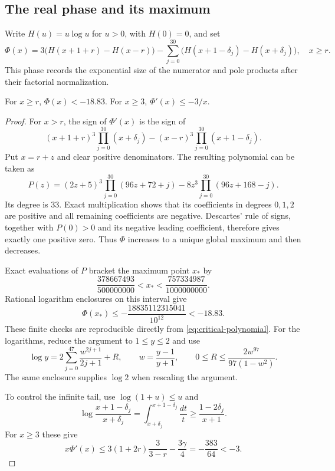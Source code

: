 \subsection{The real phase and its maximum}
Write $H(u)=u\log u$ for $u>0$, with $H(0)=0$, and set
\begin{equation}\label{eq:phase}
 \Phi(x)=3\bigl(H(x+1+r)-H(x-r)\bigr)
 -\sum_{j=0}^{30}\bigl(H(x+1-\delta_j)-H(x+\delta_j)\bigr),
 \quad x\ge r.
\end{equation}
This phase records the exponential size of the numerator and pole
products after their factorial normalization.

\begin{lemma}\label{lem:phase}
For $x\ge r$, $\Phi(x)<-18.83$. For $x\ge3$,
$\Phi'(x)\le-3/x$.
\end{lemma}
\begin{proof}
For $x>r$, the sign of $\Phi'(x)$ is the sign of
\[
 (x+1+r)^3\prod_{j=0}^{30}(x+\delta_j)
                  -(x-r)^3\prod_{j=0}^{30}(x+1-\delta_j).
\]
Put $x=r+z$ and clear positive denominators. The resulting polynomial
can be taken as
\begin{equation}\label{eq:critical-polynomial}
 P(z)=(2z+5)^3\prod_{j=0}^{30}(96z+72+j)
                       -8z^3\prod_{j=0}^{30}(96z+168-j).
\end{equation}
Its degree is $33$. Exact multiplication shows that its coefficients
in degrees $0,1,2$ are positive and all remaining coefficients are
negative. Descartes' rule of signs, together with $P(0)>0$ and its
negative leading coefficient, therefore gives exactly one positive
zero. Thus $\Phi$ increases to a unique global maximum and then
decreases.

Exact evaluations of $P$ bracket the maximum point $x_*$ by
\[
 \frac{378667493}{500000000}<x_*<\frac{757334987}{1000000000}.
\]
Rational logarithm enclosures on this interval give
\begin{equation}\label{eq:phase-certificate}
 \Phi(x_*)\le-\frac{18835112315041}{10^{12}}<-18.83.
\end{equation}
These finite checks are reproducible directly from
\eqref{eq:critical-polynomial}. For the logarithms, reduce the
argument to $1\le y\le2$ and use
\[
 \log y=2\sum_{j=0}^{47}\frac{w^{2j+1}}{2j+1}+R,
 \qquad w=\frac{y-1}{y+1},\qquad
 0\le R\le\frac{2w^{97}}{97(1-w^2)}.
\]
The same enclosure supplies $\log2$ when rescaling the argument.

To control the infinite tail, use $\log(1+u)\le u$ and
\[
 \log\frac{x+1-\delta_j}{x+\delta_j}
 =\int_{x+\delta_j}^{x+1-\delta_j}\frac{dt}{t}
 \ge\frac{1-2\delta_j}{x+1}.
\]
For $x\ge3$ these give
\[
 x\Phi'(x)\le3(1+2r)\frac{3}{3-r}-\frac{3\gamma}{4}
                  =-\frac{383}{64}<-3.
\]
\end{proof}

